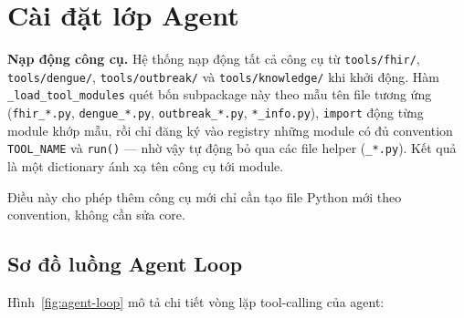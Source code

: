 \documentclass[a4paper,13pt,3p,oneside]{report}
\theoremstyle{definition}
\theoremstyle{remark}
\theoremstyle{definition}
\begin{document}
\section{Cài đặt lớp Agent}

\textbf{Nạp động công cụ.} Hệ thống nạp động tất cả công cụ từ \texttt{tools/fhir/}, \texttt{tools/dengue/}, \texttt{tools/outbreak/} và \texttt{tools/knowledge/} khi khởi động. Hàm \texttt{\_load\_tool\_modules} quét bốn subpackage này theo mẫu tên file tương ứng (\texttt{fhir\_*.py}, \texttt{dengue\_*.py}, \texttt{outbreak\_*.py}, \texttt{*\_info.py}), \texttt{import} động từng module khớp mẫu, rồi chỉ đăng ký vào registry những module có đủ convention \texttt{TOOL\_NAME} và \texttt{run()} --- nhờ vậy tự động bỏ qua các file helper (\texttt{\_*.py}). Kết quả là một dictionary ánh xạ tên công cụ tới module.

Điều này cho phép thêm công cụ mới chỉ cần tạo file Python mới theo convention, không cần sửa core.

\subsection{Sơ đồ luồng Agent Loop}

Hình~\ref{fig:agent-loop} mô tả chi tiết vòng lặp tool-calling của agent:
\end{document}
